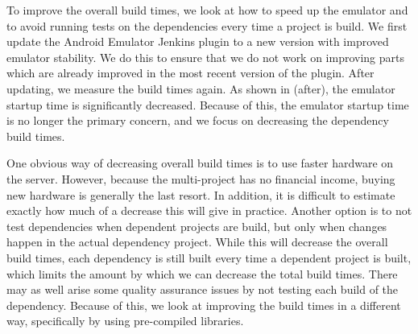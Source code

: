 To improve the overall build times, we look at how to speed up the emulator and to avoid running tests on the dependencies every time a project is build. We first update the Android Emulator Jenkins plugin to a new version with improved emulator stability. We do this to ensure that we do not work on improving parts which are already improved in the most recent version of the plugin. After updating, we measure the build times again. As shown in  (after), the emulator startup time is significantly decreased. Because of this, the emulator startup time is no longer the primary concern, and we focus on decreasing the dependency build times. 

One obvious way of decreasing overall build times is to use faster hardware on the server. However, because the multi-project has no financial income, buying new hardware is generally the last resort. In addition, it is difficult to estimate exactly how much of a decrease this will give in practice. Another option is to not test dependencies when dependent projects are build, but only when changes happen in the actual dependency project. While this will decrease the overall build times, each dependency is still built every time a dependent project is built, which limits the amount by which we can decrease the total build times. There may as well arise some quality assurance issues by not testing each build of the dependency. Because of this, we look at improving the build times in a different way, specifically by using pre-compiled libraries.

